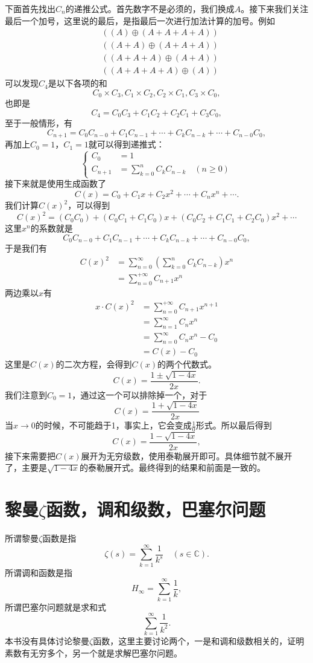 \documentclass[cn]{elegantbook}
\begin{document}
下面首先找出$C_n$的递推公式。首先数字不是必须的，我们换成$A$。接下来我们关注最后一个加号，这里说的最后，是指最后一次进行加法计算的加号。例如
\[
\begin{aligned}
&((A) \oplus (A + A + A + A))\\
&((A+A) \oplus (A + A + A)) \\
&((A+A+A) \oplus (A + A)) \\
&((A+A+A+A) \oplus (A))
\end{aligned}
\]
可以发现$C_4$是以下各项的和
\[
C_0 \times C_3, C_1 \times C_2, C_2 \times C_1, C_3 \times C_0,
\]
也即是
\[
C_4 = C_0C_3 + C_1C_2 + C_2C_1 + C_3C_0,
\]
至于一般情形，有
\[
C_{n+1} = C_0C_{n-0} + C_1C_{n-1} + \cdots + C_kC_{n-k} + \cdots + C_{n-0}C_0,
\]
再加上$C_0=1$，$C_1=1$就可以得到递推式：
\[
\left\{
\begin{aligned}
C_0 &= 1 \\
C_{n+1} &= \sum_{k=0}^{n}{C_{k}C_{n-k}} \quad (n \ge 0)
\end{aligned}
\right.
\]
接下来就是使用生成函数了
\[
C(x) = C_0 + C_1x + C_2x^2 + \cdots + C_nx^n+\cdots.
\]
我们计算$C(x)^2$，可以得到
\[
C(x)^2 = (C_0C_0) + (C_0C_1 + C_1C_0)x + (C_0C_2+C_1C_1+C_2C_0)x^2 + \cdots
\]
这里$x^n$的系数就是
\[
C_0C_{n-0} + C_1C_{n-1} + \cdots + C_kC_{n-k} + \cdots + C_{n-0}C_0,
\]
于是我们有
\[
\begin{aligned}
C(x)^2 &= \sum_{n=0}^{\infty}{(\sum_{k=0}^{n}{}C_{k}C_{n-k})x^n} \\
&= \sum_{n=0}^{+\infty}{C_{n+1}x^n}
\end{aligned}
\]
两边乘以$x$有
\[
\begin{aligned}
x \cdot C(x)^2 &= \sum_{n=0}^{+\infty}{C_{n+1}x^{n+1}} \\
&= \sum_{n=1}^{\infty}{C_nx^n} \\
&= \sum_{n=0}^{\infty}{C_nx^n} - C_0 \\
&= C(x) - C_0
\end{aligned}
\]
这里是$C(x)$的二次方程，会得到$C(x)$的两个代数式。
\[
C(x) = \frac{1 \pm \sqrt{1 - 4x}}{2x}.
\]
我们注意到$C_0=1$，通过这一个可以排除掉一个，对于
\[
C(x) = \frac{1 + \sqrt{1 - 4x}}{2x}
\]
当$x \to 0$的时候，不可能趋于1，事实上，它会变成$\frac{1}{0}$形式。所以最后得到
\[
C(x) = \frac{1 - \sqrt{1 - 4x}}{2x},
\]
接下来需要把$C(x)$展开为无穷级数，使用泰勒展开即可。具体细节就不展开了，主要是$\sqrt{1-4x}$的泰勒展开式。最终得到的结果和前面是一致的。

\chapter{黎曼$\zeta$函数，调和级数，巴塞尔问题}
所谓黎曼$\zeta$函数是指
\[
\zeta(s) = \sum_{k=1}^{\infty}{\frac{1}{k^s}} \quad (s \in \mathbb{C}).
\]
所谓调和函数是指
\[
H_{\infty} = \sum_{k=1}^{\infty}{\frac{1}{k}},
\]
所谓巴塞尔问题就是求和式
\[
\sum_{k=1}^{\infty}{\frac{1}{k^2}}.
\]
本书没有具体讨论黎曼$\zeta$函数，这里主要讨论两个，一是和调和级数相关的，证明素数有无穷多个，另一个就是求解巴塞尔问题。
\end{document}
